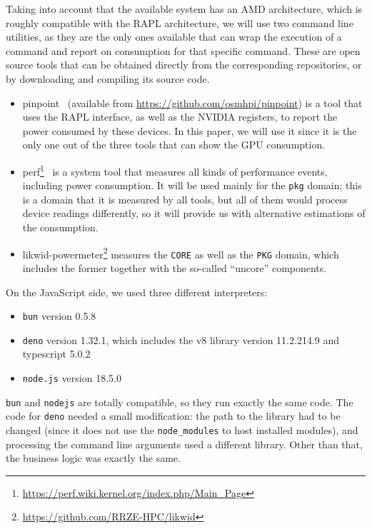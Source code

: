 \documentclass[a4paper,twoside]{article}
\begin{document}
Taking into account that the available system has an AMD architecture, which is
roughly compatible with the RAPL architecture, we will use two command line
utilities, as they are the only ones available that can wrap the execution of a command
and report on consumption for that specific command. These are open source tools
that can be obtained directly from the corresponding repositories, or by downloading and
compiling its source code. \begin{itemize}
\item {\sf pinpoint}~\cite{9307947} (available from
  \url{https://github.com/osmhpi/pinpoint}) is a tool that uses the RAPL
  interface, as well as the NVIDIA registers, to report the power consumed by
  these devices. In this paper, we will use it since it is the only one out of
  the three tools that can show the GPU consumption.
\item {\sf
    perf}\footnote{\url{https://perf.wiki.kernel.org/index.php/Main_Page}}~\cite{treibig2010likwid} is a
  system tool that measures all kinds of performance events, including power
  consumption. It will be used mainly for the  \texttt{pkg} domain; this is a
  domain that it is measured by all tools, but all of them would process device
    readings differently, so it will provide us with alternative estimations of
    the consumption. %
\item {\sf likwid-powermeter}\footnote{\url{https://github.com/RRZE-HPC/likwid}}
  measures the \texttt{CORE} as well as the \texttt{PKG} domain, which includes
  the former together with the so-called ``uncore'' components.
\end{itemize}

On the JavaScript side, we used three different interpreters:\begin{itemize}
\item \texttt{bun} version 0.5.8
\item \texttt{deno} version 1.32.1, which includes the v8 library version
  11.2.214.9 and typescript 5.0.2
\item  \texttt{node.js} version 18.5.0
\end{itemize}

\texttt{bun} and \texttt{nodejs} are totally compatible, so they run exactly the
same code. The code for \texttt{deno} needed a small modification: the path to
the library had to be changed (since it does not use the \texttt{node\_modules}
to host installed modules), and processing the command line arguments used a
different library. Other than that, the business logic was exactly the same.
\end{document}
